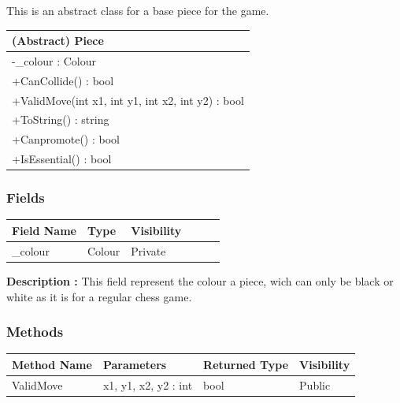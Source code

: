 \documentclass[12pt]{article}
\begin{document}
This is an abstract class for a base piece for the game.
\begin{table}[H]
    \begin{tabular}{|l|}
    \hline
    \cellcolor[HTML]{C0C0C0}\textbf{(Abstract) Piece}  \\ \hline
    \cellcolor[HTML]{EFEFEF}-\_colour : Colour         \\ \hline
    +CanCollide() : bool                               \\ \hline
    +ValidMove(int x1, int y1, int x2, int y2) : bool  \\ \hline
    +ToString() : string                               \\ \hline
    +Canpromote() : bool                               \\ \hline
    +IsEssential() : bool                              \\ \hline
    \end{tabular}
\end{table}

\subsubsection{Fields}

\begin{table}[H]
    \begin{tabular}{llllll}
    \hline
    \multicolumn{1}{|l|}{\cellcolor[HTML]{EFEFEF}\textbf{Field Name}} & \multicolumn{1}{l|}{\cellcolor[HTML]{EFEFEF}\textbf{Type}} & \multicolumn{1}{l|}{\cellcolor[HTML]{EFEFEF}\textbf{Visibility}} \\ \hline
    \multicolumn{1}{|l|}{\_colour}                                    & \multicolumn{1}{l|}{Colour}                                & \multicolumn{1}{l|}{Private}                                     \\ \hline
    \end{tabular}
\end{table}

\textbf{Description :} This field represent the colour a piece, wich can only be
black or white as it is for a regular chess game.


\subsubsection{Methods}

\begin{table}[H]
    \begin{tabular}{|l|l|l|l|}
    \hline
    \rowcolor[HTML]{EFEFEF} 
    \cellcolor[HTML]{EFEFEF}\textbf{Method Name} & \textbf{Parameters}  & \textbf{Returned Type} & \textbf{Visibility} \\ \hline
    ValidMove                          & x1, y1, x2, y2 : int & bool                   & Public              \\ \hline
    \end{tabular}
\end{table}
\end{document}

